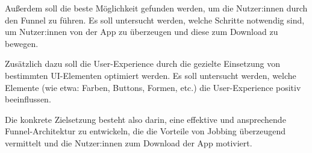 Außerdem soll die beste Möglichkeit gefunden werden, um die Nutzer:innen durch den Funnel zu führen.
Es soll untersucht werden, welche Schritte notwendig sind, um Nutzer:innen von der
App zu überzeugen und diese zum Download zu bewegen.

Zusätzlich dazu soll die User-Experience durch die gezielte Einsetzung von bestimmten UI-Elementen
optimiert werden. Es soll untersucht werden, welche Elemente (wie etwa: Farben, Buttons, Formen, etc.)
die User-Experience positiv beeinflussen.

Die konkrete Zielsetzung besteht also darin, eine effektive und ansprechende Funnel-Architektur zu entwickeln, 
die die Vorteile von Jobbing überzeugend vermittelt und die Nutzer:innen zum Download der App motiviert.

